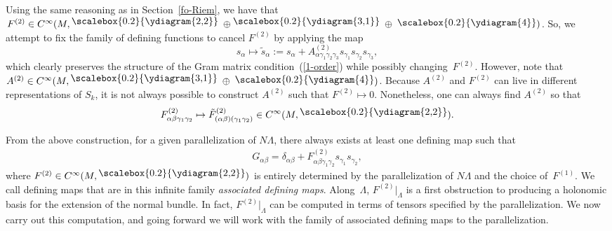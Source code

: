 Using the same reasoning as in Section~\ref{fo-Riem}, we have that $F^{(2)} \in C^\infty (M, \raisebox{3pt}{\scalebox{0.2}{\ydiagram{2,2}}} \; \oplus \raisebox{3pt}{\scalebox{0.2}{\ydiagram{3,1}}} \; \oplus \; \raisebox{1.5pt}{\scalebox{0.2}{\ydiagram{4}}})$. So, we attempt to fix the family of defining functions to cancel $F^{(2)}$ by applying the map
\[
s_{\alpha} \mapsto \tilde{s}_{\alpha} := s_{\alpha} + A^{(2)}_{\alpha \gamma_1 \gamma_2 \gamma_3} s_{\gamma_1} s_{\gamma_2} s_{\gamma_3} ,
\]
which clearly preserves the structure of the Gram matrix condition~(\ref{1-order}) while possibly changing~$F^{(2)}$. However, note that $A^{(2)} \in C^\infty (M, \raisebox{3pt}{\scalebox{0.2}{\ydiagram{3,1}}} \; \oplus \; \raisebox{1.5pt}{\scalebox{0.2}{\ydiagram{4}}})$. Because $A^{(2)}$ and $F^{(2)}$ can live in different representations of $S_k$, it is not always possible to construct $A^{(2)}$ such that $F^{(2)} \mapsto 0$. Nonetheless, one can always find $A^{(2)}$ so that
\[
F^{(2)}_{\alpha \beta \gamma_1 \gamma_2} \mapsto \tilde{F}^{(2)}_{(\alpha \beta)(\gamma_1 \gamma_2)} \in C^\infty (M,\raisebox{3pt}{\scalebox{0.2}{\ydiagram{2,2}}}).
\]



From the above construction, for a given parallelization of $N \Lambda$, there always exists at least one defining map such that
\begin{align*} %
G_{\alpha \beta} = \delta_{\alpha \beta} + F^{(2)}_{\alpha \beta \gamma_1 \gamma_2} s_{\gamma_1} s_{\gamma_2} ,
\end{align*}
where $F^{(2)} \in C^\infty (M,\raisebox{3pt}{\scalebox{0.2}{\ydiagram{2,2}}})$ is entirely determined by the parallelization of $N \Lambda$ and the choice of~$F^{(1)}$. We call defining maps that are in this infinite family \textit{associated defining maps}. Along~$\Lambda$, $F^{(2)}|_{\Lambda}$ is a first obstruction to producing a holonomic basis for the extension of the normal bundle. In fact, $F^{(2)}|_{\Lambda}$ can be computed in terms of tensors specified by the parallelization. We now carry out this computation, and going forward we will work with the family of associated defining maps to the parallelization.


